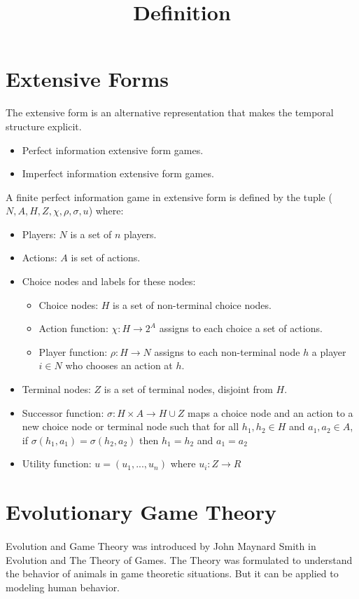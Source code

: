 \section{Extensive Forms}{The extensive form is an alternative representation that makes the temporal structure explicit.}
\begin{itemize}
\item{Perfect information extensive form games.}
\item{Imperfect information extensive form games.}
\end{itemize}
\title {\textbf{Definition}} A finite perfect information game in extensive form is defined by the tuple ($N, A, H, Z,\chi ,\rho, \sigma, u $)
where:
\begin{itemize}
\item{Players: $N$ is a set of $n$ players.}
\item{Actions: $A$ is set of actions.}
\item{Choice nodes and labels for these nodes: }
\begin{itemize}
\item{Choice nodes: $H$ is a set of non-terminal choice nodes.}
\item{Action function: $\chi : H \to 2^A $ assigns to each choice a set of actions.}
\item{Player function: $\rho : H \to N$ assigns to each non-terminal node $h$ a player $i \in N$ who chooses an action at $h$.}
\end{itemize}
\item{Terminal nodes: $Z$ is a set of terminal nodes, disjoint from $H$.}
\item{Successor function: $\sigma : H \times A \to H \cup Z$ maps a choice node and an action to a new choice node or terminal node such that for all $h_1, h_2 \in H$ and $a_1, a_2 \in A$, if $\sigma(h_1, a_1) = \sigma(h_2, a_2)$ then $h_1  = h_2$  and $a_1 = a_2$} 
\item{Utility function: $u = (u_1,...,u_n)$ where $u_i : Z \to R$
}
\end{itemize} 
\section{Evolutionary Game Theory}
\paragraph{}Evolution and Game Theory was introduced by John Maynard Smith in Evolution and The Theory of Games. The Theory was formulated to understand the behavior of animals in game theoretic situations. But it can be applied to modeling human behavior.

